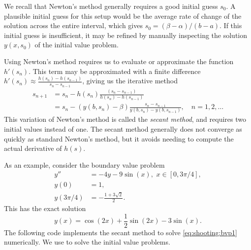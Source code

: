 We recall that Newton's method generally requires a good initial guess $s_0$.
A plausible initial guess for this setup would be the average rate of change of the solution across the entire interval, which gives $s_0 =  (\beta - \alpha)/(b-a)$.
If this initial guess is insufficient, it may be refined by manually inspecting the solution $y(x,s_0)$ of the initial value problem.

Using Newton's method requires us to evaluate or approximate the function $h'(s_n)$.
This term may be approximated with a finite difference \(h'(s_n)\approx \frac{h(s_n)-h(s_{n-1})}{s_n-s_{n-1}}\), giving us the iterative method
\begin{align*}
s_{n+1} &= s_n - h(s_n)\frac{ (s_n - s_{n-1})}{h(s_n)-h(s_{n-1}) }
\\
&= s_n - (y(b,s_n) - \beta)\frac{s_n-s_{n-1}}{y(b,s_n) - y(b,s_{n-1})}, 
\quad n = 1, 2,\hdots
\end{align*}
This variation of Newton's method is called the \textit{secant method}, and requires two initial values instead of one.
The secant method generally does not converge as quickly as standard Newton's method, but it avoids needing to compute the actual derivative of \(h(s)\).

As an example, consider the boundary value problem
\begin{equation}
\begin{split}
\label{eq:shooting:bvp1}
y'' &= -4y -9\sin(x), \,\, x \in [0,3\pi/4],\\
y(0) &= 1, \\
y(3 \pi/4) &= -\frac{1+3\sqrt{2}}{2}.
\end{split}
\end{equation}
This has the exact solution
\[
y(x)=\cos(2x)+\frac{1}{2}\sin(2x)-3\sin(x).
\]
The following code implements the secant method to solve \eqref{eq:shooting:bvp1} numerically.
We use  to solve the initial value problems.


